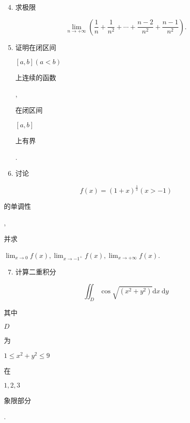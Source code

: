 \documentclass[10pt]{article}
\begin{document}
\begin{enumerate}
  \setcounter{enumi}{3}
  \item \begin{CJK}{UTF8}{mj}求极限\end{CJK}
\end{enumerate}
$$
\lim _{n \rightarrow+\infty}\left(\frac{1}{n}+\frac{1}{n^{2}}+\cdots+\frac{n-2}{n^{2}}+\frac{n-1}{n^{2}}\right) .
$$

\begin{enumerate}
  \setcounter{enumi}{4}
  \item \begin{CJK}{UTF8}{mj}证明在闭区间\end{CJK} $[a, b](a<b)$ \begin{CJK}{UTF8}{mj}上连续的函数\end{CJK}, \begin{CJK}{UTF8}{mj}在闭区间\end{CJK} $[a, b]$ \begin{CJK}{UTF8}{mj}上有界\end{CJK}.

  \item \begin{CJK}{UTF8}{mj}讨论\end{CJK}

\end{enumerate}
$$
f(x)=(1+x)^{\frac{1}{x}}(x>-1)
$$
\begin{CJK}{UTF8}{mj}的单调性\end{CJK}, \begin{CJK}{UTF8}{mj}并求\end{CJK} $\lim _{x \rightarrow 0} f(x), \lim _{x \rightarrow-1^{+}} f(x), \lim _{x \rightarrow+\infty} f(x)$.

\begin{enumerate}
  \setcounter{enumi}{6}
  \item \begin{CJK}{UTF8}{mj}计算二重积分\end{CJK}
\end{enumerate}
$$
\iint_{D} \cos \sqrt{\left(x^{2}+y^{2}\right)} \mathrm{d} x \mathrm{~d} y
$$
\begin{CJK}{UTF8}{mj}其中\end{CJK} $D$ \begin{CJK}{UTF8}{mj}为\end{CJK} $1 \leq x^{2}+y^{2} \leq 9$ \begin{CJK}{UTF8}{mj}在\end{CJK} $1,2,3$ \begin{CJK}{UTF8}{mj}象限部分\end{CJK}.
\end{document}
